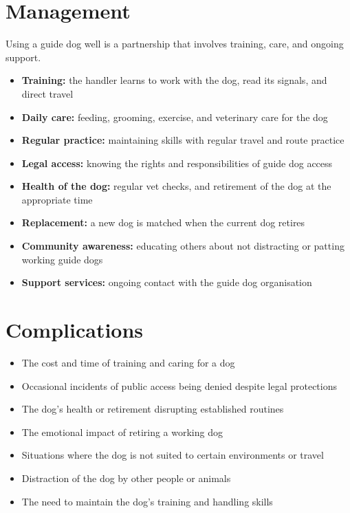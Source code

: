 \section*{Management}
Using a guide dog well is a partnership that involves training, care, and ongoing support.

\begin{itemize}
    \item \textbf{Training:} the handler learns to work with the dog, read its signals, and direct travel
    \item \textbf{Daily care:} feeding, grooming, exercise, and veterinary care for the dog
    \item \textbf{Regular practice:} maintaining skills with regular travel and route practice
    \item \textbf{Legal access:} knowing the rights and responsibilities of guide dog access
    \item \textbf{Health of the dog:} regular vet checks, and retirement of the dog at the appropriate time
    \item \textbf{Replacement:} a new dog is matched when the current dog retires
    \item \textbf{Community awareness:} educating others about not distracting or patting working guide dogs
    \item \textbf{Support services:} ongoing contact with the guide dog organisation
\end{itemize}

\section*{Complications}
\begin{itemize}
    \item The cost and time of training and caring for a dog
    \item Occasional incidents of public access being denied despite legal protections
    \item The dog's health or retirement disrupting established routines
    \item The emotional impact of retiring a working dog
    \item Situations where the dog is not suited to certain environments or travel
    \item Distraction of the dog by other people or animals
    \item The need to maintain the dog's training and handling skills
\end{itemize}

